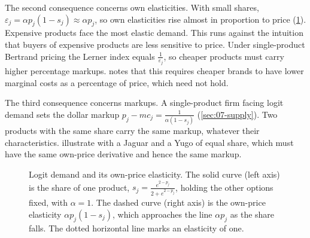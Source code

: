 The second consequence concerns own elasticities. With small shares, $\varepsilon_j = \alpha p_j(1 - s_j)
\approx \alpha p_j$, so own elasticities rise almost in proportion to price (\cref{fig:07-logit-demand}).
Expensive products face the most elastic demand. This runs against the intuition that buyers of expensive
products are less sensitive to price. Under single-product Bertrand pricing the Lerner index equals
$\frac{1}{\varepsilon_j}$, so cheaper products must carry higher percentage markups.
\citet[p.~522]{Nevo2000a} notes that this requires cheaper brands to have lower marginal costs as a percentage
of price, which need not hold.

The third consequence concerns markups. A single-product firm facing logit demand sets the dollar markup
$p_j - mc_j = \frac{1}{\alpha(1 - s_j)}$ (\cref{sec:07-supply}). Two products with the same share carry the
same markup, whatever their characteristics. \citet[p.~847]{BerryLevinsohnPakes1995} illustrate with a Jaguar
and a Yugo of equal share, which must have the same own-price derivative and hence the same markup.

\begin{figure}[htbp]
\centering
{}
\caption{Logit demand and its own-price elasticity. The solid curve (left axis) is the share of one product,
$s_j = \frac{e^{2 - p_j}}{2 + e^{2 - p_j}}$, holding the other options fixed, with $\alpha = 1$. The dashed
curve (right axis) is the own-price elasticity $\alpha p_j(1 - s_j)$, which approaches the line $\alpha p_j$ as
the share falls. The dotted horizontal line marks an elasticity of one.}
\label{fig:07-logit-demand}
\end{figure}

